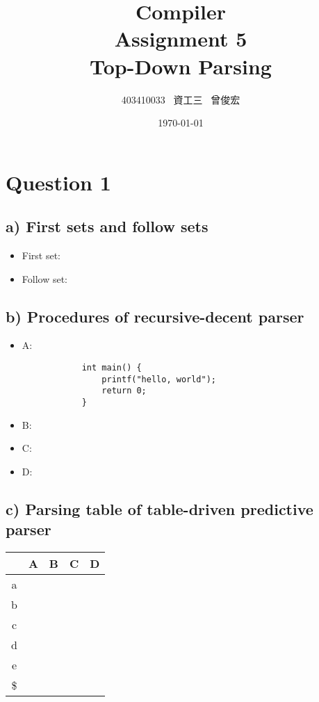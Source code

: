 \documentclass[12pt, A4]{article}
\title{Compiler \\ Assignment 5 \\ Top-Down Parsing}
\author{403410033 \ 資工三 \ 曾俊宏}
\date{\today}
\begin{document}
	
	\maketitle
	\newpage

	\section{Question 1}
	
	\subsection*{a) First sets and follow sets}
	
	\begin{itemize}
		\item First set: 
		\item Follow set:
	\end{itemize}
	
	\subsection*{b) Procedures of recursive-decent parser}
	
	\begin{itemize}
		\item A: 
			\begin{verbatim}
			int main() {
				printf("hello, world");
				return 0;
			}
			\end{verbatim}
		\item B:
		\item C:
		\item D:
	\end{itemize}
	
	\subsection*{c) Parsing table of table-driven predictive parser}
	
	\begin{tabular}{|c|c|c|c|c|}
		\hline 
		   & A & B & C & D \\ 
		\hline 
		a  &  &  &  &  \\ 
		\hline 
		b  &  &  &  &  \\ 
		\hline 
		c  &  &  &  &  \\ 
		\hline 
		d  &  &  &  &  \\ 
		\hline 
		e  &  &  &  &  \\ 
		\hline 
		\$ &  &  &  &  \\ 
		\hline 
	\end{tabular} 
	
\end{document}
